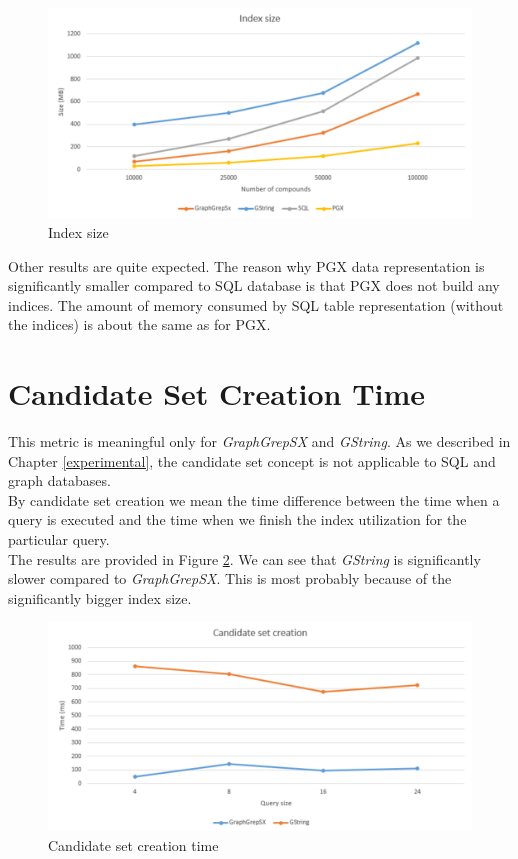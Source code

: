 \begin{figure}[h]
	\centering
	\includegraphics[width=1\textwidth]{../img/indexSize.pdf}
	\caption{Index size}
	\label{fig:indexsize}
\end{figure}

Other results are quite expected. The reason why PGX data representation is significantly smaller compared to SQL database is that PGX does not build any indices. The amount of memory consumed by SQL table representation (without the indices) is about the same as for PGX.

\section{Candidate Set Creation Time}
This metric is meaningful only for \textit{GraphGrepSX} and \textit{GString}. As we described in Chapter \ref{experimental}, the candidate set concept is not applicable to SQL and graph databases.\\

By candidate set creation we mean the time difference between the time when a query is executed and the time when we finish the index utilization for the particular query.\\

The results are provided in Figure \ref{fig:candidateset}. We can see that \textit{GString} is significantly slower compared to \textit{GraphGrepSX}. This is most probably because of the significantly bigger index size.\\

\begin{figure}[h]
	\centering
	\includegraphics[width=1\textwidth]{../img/candidateSet.pdf}
	\caption{Candidate set creation time}
	\label{fig:candidateset}
\end{figure}

